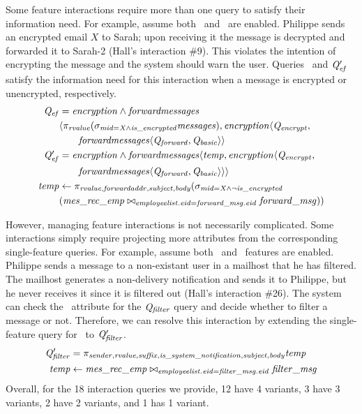 \noindent
%
Some feature interactions require more than one query to satisfy their
information need.
For example, assume both \encryption\ and \forwardmessages\ are enabled.
Philippe sends an encrypted email $X$ to Sarah; upon receiving it the message
is decrypted and forwarded it to Sarah-2 (Hall's interaction \#9). This
violates the intention of encrypting the message and the system should warn the
user.
%
Queries \Qef\ and $\Qef'$ satisfy the information need for this interaction
when a message is encrypted or unencrypted, respectively.
%
\begin{align*}
\small
\Qef &= \encryption\wedge\forwardmessages \\
  &\langle
    \projectRel{\rvalue}{(\selectRel{\midCond\wedge\isencrypted}{\messages})},
    \encryption\langle\Qencrypt, \\
  &\qquad \chc[\forwardmessages]{\Qforward,\Qbasic} \rangle \\
\OB{\Qef'} &= \encryption\wedge\forwardmessages
  \langle \temp, \encryption \langle \Qencrypt, \\
  &\qquad \chc[\forwardmessages]{\Qforward,\Qbasic} \rangle \rangle \\
\temp &\leftarrow
  \pi_{\rvalue,\forwardaddr,\subject,\body} (\sigma_{\midCond \wedge \neg\isencrypted} \\
  & (\mretable \bowtie_{\employees.\eid = \forwardmsg.\eid} \forwardmsg))
\end{align*}

\noindent
%
However, managing feature interactions is not necessarily complicated. Some
interactions simply require projecting more attributes from the corresponding
single-feature queries. For example, assume both \filtermessages\ and
\mailhost\ features are enabled. Philippe sends a message to a non-existant
user in a mailhost that he has filtered. The mailhost generates a non-delivery
notification and sends it to Philippe, but he never receives it since it is filtered out
(Hall's interaction \#26). The system can check the \issystemnotification\
attribute for the $\Qfilter$ query and decide whether to filter a message or
not. Therefore, we can resolve this interaction by extending the single-feature
query for \filtermessages\ to $\Qfilter'$.
%
\begin{align*}
\small
\OB{\Qfilter'} &= 
\projectRel {\sender, \rvalue, \suffix, \issystemnotification, \subject, \body} \temp\\
\temp &\leftarrow 
{\joinRel \mretable
\filtermsg
{\employees . \eid = \filtermsg . \eid }
}
\end{align*}
\noindent
%
Overall, for the 18 interaction queries we provide, 12 have 4 variants, 3 have
3 variants, 2 have 2 variants, and 1 has 1 variant.

